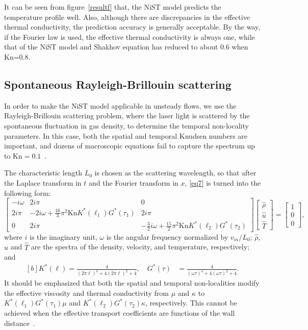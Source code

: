 \documentclass[lineno]{jfm}
\begin{document}
It can be seen from figure~\ref{resultf} that, the NiST model predicts the temperature profile well. Also, although there are discrepancies in the effective thermal conductivity, the prediction accuracy is generally acceptable. By the way, if the Fourier law is used, the effective thermal conductivity is always one, while that of the NiST model and Shakhov equation has reduced to about 0.6 when Kn=0.8.



\subsection{Spontaneous Rayleigh-Brillouin scattering}

In order to make the NiST model applicable in unsteady flows, we use the Rayleigh-Brillouin scattering problem, where the laser light is scattered by the spontaneous fluctuation in gas density, to determine the temporal non-locality parameters.
In this case, both the spatial and temporal Knudsen numbers are important, and dozens of macroscopic equations fail to capture the spectrum up to $\text{Kn}=0.1$~\citep{cite8}. 

The characteristic length $L_0$ is chosen as the scattering wavelength, so that after the Laplace transform in $t$ and the Fourier transform in $x$, \eqref{eq7} is turned into the following form:
	\begin{equation}\label{eq37}
		\begin{bmatrix}
			-i\omega & 2 i \pi & 0 \\
			2 i \pi &  -2 i \omega + \frac{16}{3} \pi^2 \text{Kn} K^* (\ell_1)G^*(\tau_1) & 2 i \pi \\
			0 & 2 i \pi & -\frac{3}{2} i \omega + \frac{15}{2}  \pi^2 \text{Kn} K^*(\ell_2) G^*(\tau_2)
		\end{bmatrix}
		\begin{bmatrix}
			\hat{\rho}\\
			\hat{u}\\
			\hat{T}
		\end{bmatrix}
		=
		\begin{bmatrix}
			1\\
			0\\
			0
		\end{bmatrix},
	\end{equation}
where $i$ is the imaginary unit, $\omega$  is the  angular frequency normalized by $v_m/L_0$; $\hat{\rho}$, $\hat{u}$ and $\hat{T}$ are the spectra of the density, velocity, and temperature, respectively; and  
\begin{equation}\label{Fourier_G}
	\begin{aligned}[b]
		K^*(\ell) =\frac{4}{(2\pi\ell)^4+4(2\pi\ell)^2+4},\quad 
		G^*(\tau) &=\frac{4}{(\omega\tau )^4+4(\omega\tau)^2+4}.
	\end{aligned}
\end{equation}
It should be emphasized that both the spatial and temporal non-localities modify the effective viscosity and thermal conductivity from $\mu$ and $\kappa$ to $K^* (\ell_1)G^*(\tau_1)\mu$ and $K^*(\ell_2) G^*(\tau_2)\kappa$, respectively. This cannot be achieved when the effective transport coefficients are functions of the wall distance~\citep{zhang2005PRE,Dongari2012,Dongari2013PoF}.
\end{document}
